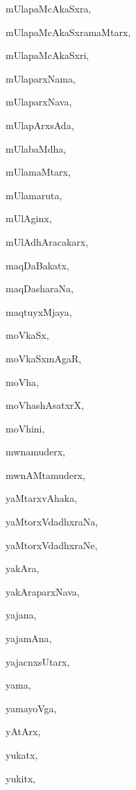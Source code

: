 \begin{multicols}{2}
{mUlapaMcAkaSxra}, \pageref{mUlapaMcAkaSxra}

{mUlapaMcAkaSxramaMtarx}, \pageref{mUlapaMcAkaSxramaMtarx}

{mUlapaMcAkaSxri}, \pageref{mUlapaMcAkaSxri}

{mUlaparxNama}, \pageref{mUlaparxNama}

{mUlaparxNava}, \pageref{mUlaparxNava}

{mUlapArxsAda}, \pageref{mUlapArxsAda}

{mUlabaMdha}, \pageref{mUlabaMdha}

{mUlamaMtarx}, \pageref{mUlamaMtarx}

{mUlamaruta}, \pageref{mUlamaruta}

{mUlAginx}, \pageref{mUlAginx}

{mUlAdhAracakarx}, \pageref{mUlAdhAracakarx}

{maqDaBakatx}, \pageref{maqDaBakatx}

{maqDasharaNa}, \pageref{maqDasharaNa}

{maqtuyxMjaya}, \pageref{maqtuyxMjaya}

{moVkaSx}, \pageref{moVkaSx}

{moVkaSxmAgaR}, \pageref{moVkaSxmAgaR}

{moVha}, \pageref{moVha}

{moVhashAsatxrX}, \pageref{moVhashAsatxrX}

{moVhini}, \pageref{moVhini}

{mwnamuderx}, \pageref{mwnamuderx}

{mwnAMtamuderx}, \pageref{mwnAMtamuderx}

{yaMtarxvAhaka}, \pageref{yaMtarxvAhaka}

{yaMtorxVdadhxraNa}, \pageref{yaMtorxVdadhxraNa}

{yaMtorxVdadhxraNe}, \pageref{yaMtorxVdadhxraNe}

{yakAra}, \pageref{yakAra}

{yakAraparxNava}, \pageref{yakAraparxNava}

{yajana}, \pageref{yajana}

{yajamAna}, \pageref{yajamAna}

{yajacnxsUtarx}, \pageref{yajacnxsUtarx}

{yama}, \pageref{yama}

{yamayoVga}, \pageref{yamayoVga}

{yAtArx}, \pageref{yAtArx}

{yukatx}, \pageref{yukatx}

{yukitx}, \pageref{yukitx}


\end{multicols}
